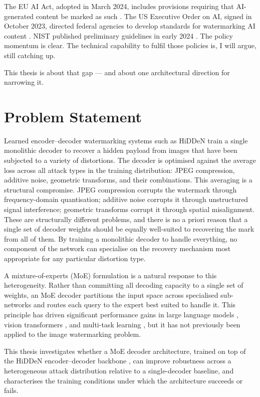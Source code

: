 ﻿\documentclass[12pt, a4paper, twoside]{report}
\numberwithin{equation}{chapter}
\begin{document}
The EU AI Act, adopted in March 2024, includes provisions requiring that AI-generated content be marked as such \cite{euaiact2024}. The US Executive Order on AI, signed in October 2023, directed federal agencies to develop standards for watermarking AI content \cite{biden2023eo}. NIST published preliminary guidelines in early 2024 \cite{nist2024synthetic}. The policy momentum is clear. The technical capability to fulfil those policies is, I will argue, still catching up.

This thesis is about that gap --- and about one architectural direction for narrowing it.

\section{Problem Statement}
 
Learned encoder--decoder watermarking systems such as HiDDeN \cite{zhu2018} train a single monolithic decoder to recover a hidden payload from images that have been subjected to a variety of distortions. The decoder is optimised against the average loss across all attack types in the training distribution: JPEG compression, additive noise, geometric transforms, and their combinations. This averaging is a structural compromise. JPEG compression corrupts the watermark through frequency-domain quantisation; additive noise corrupts it through unstructured signal interference; geometric transforms corrupt it through spatial misalignment. These are structurally different problems, and there is no a priori reason that a single set of decoder weights should be equally well-suited to recovering the mark from all of them. By training a monolithic decoder to handle everything, no component of the network can specialise on the recovery mechanism most appropriate for any particular distortion type.
 
A mixture-of-experts (MoE) formulation is a natural response to this heterogeneity. Rather than committing all decoding capacity to a single set of weights, an MoE decoder partitions the input space across specialised sub-networks and routes each query to the expert best suited to handle it. This principle has driven significant performance gains in large language models \cite{shazeer2017}, vision transformers \cite{riquelme2021}, and multi-task learning \cite{ma2018}, but it has not previously been applied to the image watermarking problem.
 
This thesis investigates whether a MoE decoder architecture, trained on top of the HiDDeN encoder--decoder backbone \cite{zhu2018}, can improve robustness across a heterogeneous attack distribution relative to a single-decoder baseline, and characterises the training conditions under which the architecture succeeds or fails.
 
\end{document}
